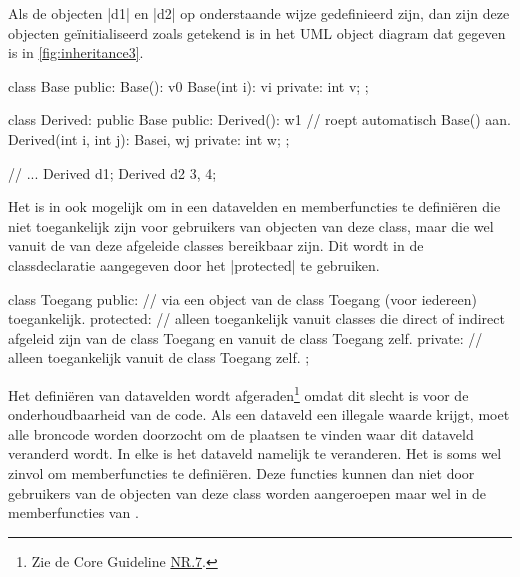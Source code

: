 \begin{cpplstShortInline}
Als de objecten |d1| en |d2| op onderstaande wijze gedefinieerd zijn, dan zijn deze objecten geïnitialiseerd zoals getekend is in het UML object diagram dat gegeven is in  \cref{fig:inheritance3}.

\vspace{-.5\baselineskip}
\begin{minipage}{\textwidth}
\begin{minipage}[c]{.5\textwidth}
\begin{cpplstfragment}
class Base {
public:
    Base(): v{0} { }
    Base(int i): v{i} { }
private:
    int v;
};
\end{cpplstfragment}
\end{minipage}
\hfill
\begin{minipage}[c]{.5\textwidth}
\end{minipage}
\end{minipage}

\begin{cpplstfragment}
class Derived: public Base {
public:
    Derived(): w{1} { } // roept automatisch Base() aan.
    Derived(int i, int j): Base{i}, w{j} { }
private:
    int w;
};

//  ...
    Derived d1;
    Derived d2 {3, 4};
\end{cpplstfragment}

Het is in \Cpp{} ook mogelijk om in een  datavelden en memberfuncties te definiëren die niet toegankelijk zijn voor gebruikers van objecten van deze class, maar die wel vanuit de van deze  afgeleide classes bereikbaar zijn.
Dit wordt in de classdeclaratie aangegeven door het  |protected| te gebruiken.

\begin{cpplstfragment}
class Toegang {
public:
    // via een object van de class Toegang (voor iedereen) toegankelijk.
protected:
    // alleen toegankelijk vanuit classes die direct of indirect afgeleid zijn van de class Toegang en vanuit de class Toegang zelf.
private:
    // alleen toegankelijk vanuit de class Toegang zelf.
};
\end{cpplstfragment}

Het definiëren van  datavelden wordt afgeraden\footnote{%
	Zie de \Cpp{} Core Guideline \href{https://isocpp.github.io/CppCoreGuidelines/CppCoreGuidelines\#nr7-dont-make-all-data-members-protected}{NR.7}.
} omdat dit slecht is voor de onderhoudbaarheid van de code.
Als een  dataveld een illegale waar\-de krijgt, moet alle broncode worden doorzocht om de plaatsen te vinden waar dit dataveld veranderd wordt. 
In elke  is het  dataveld namelijk te veranderen.
Het is soms wel zinvol om  memberfuncties te definiëren.
Deze  functies kunnen dan niet door gebruikers van de objecten van deze class worden aangeroepen maar wel in de memberfuncties van .


\end{cpplstShortInline}
